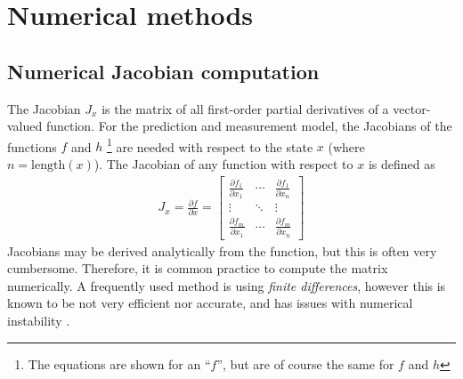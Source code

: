 \section{Numerical methods}

\subsection{Numerical Jacobian computation}
\label{sec:numerical-jacobians}
The Jacobian $J_x$ is the matrix of all first-order partial derivatives of a vector-valued function.
For the prediction and measurement model, the Jacobians of  the functions $f$ and $h$ \footnote{The equations are shown for an ``$f$'', but are of course the same for $f$ and $h$} are needed with respect to the state $x$ (where $n = \mathrm{length}(x)$).
The Jacobian of any function with respect to $x$ is defined as%
\begin{align}
    J_x = \frac{\partial f}{\partial x}
    = \begin{bmatrix}
        \frac{\partial f_1}{\partial x_1} & \cdots & \frac{\partial f_1}{\partial x_n} \\
        \vdots & \ddots & \vdots \\
        \frac{\partial f_m}{\partial x_1} & \cdots & \frac{\partial f_m}{\partial x_n}
    \end{bmatrix}
\end{align}
Jacobians may be derived analytically from the function, but this is often very cumbersome. %
Therefore, it is common practice to compute the matrix numerically.
A frequently used method is using \textit{finite differences}, however this is known to be not very efficient nor accurate, and has issues with numerical instability \cite{martins2021}.

